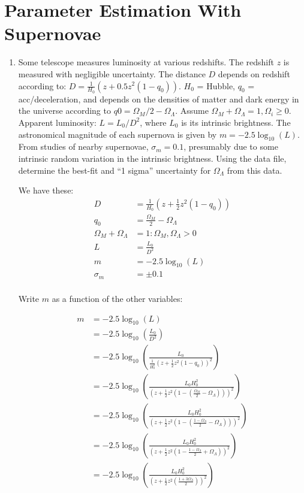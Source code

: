 \section{Parameter Estimation With Supernovae}

\begin{enumerate}[label=\textbf{\Alph*}.]
    \item Some telescope measures luminosity at various redshifts.
    The redshift $z$ is measured with negligible uncertainty.
    The distance $D$ depends on redshift according to: $D = \frac{1}{H_0}(z + 0.5z^2(1-q_0))$.
    $H_0$ = Hubble, $q_0$ = acc/deceleration, and depends on the densities of matter and dark energy in the universe according to $q0 = \Omega_M/2 - \Omega_\Lambda$.
    Assume $\Omega_M + \Omega_\Lambda = 1, \Omega_i \ge 0$.
    Apparent luminosity: $L=L_0/D^2$, where $L_0$ is its intrinsic brightness.
    The astronomical magnitude of each supernova is given by $m = -2.5\log_{10}(L)$.
    From studies of nearby supernovae, $\sigma_m = 0.1$, presumably due to some intrinsic random variation in the intrinsic brightness.
    Using the data file, determine the best-fit and ``1 sigma'' uncertainty for $\Omega_\Lambda$ from this data.

    We have these:
    \begin{align*}
        D &= \frac{1}{H_0} \left(z + \frac{1}{2}z^2 (1-q_0)\right)\\
        q_0 &= \frac{\Omega_M}{2} - \Omega_\Lambda\\
        \Omega_M + \Omega_\Lambda &= 1: \Omega_M, \Omega_\Lambda > 0\\
        L &= \frac{L_0}{D^2}\\
        m &= -2.5\log_{10}(L)\\
        \sigma_m &= \pm 0.1 \\
    \end{align*}

    Write $m$ as a function of the other variables:

    \begin{align*}
        m &= -2.5\log_{10}(L)\\
        &= -2.5\log_{10}\left(\frac{L_0}{D^2}\right)\\
        &= -2.5\log_{10}\left(\frac{L_0}{\frac{1}{H_0^2} \left(z + \frac{1}{2}z^2 (1-q_0)\right)^2}\right)\\
        &= -2.5\log_{10}\left(\frac{L_0H_0^2}{\left(z + \frac{1}{2}z^2 \left(1-\left(\frac{\Omega_M}{2} - \Omega_\Lambda\right)\right)\right)^2}\right)\\
        &= -2.5\log_{10}\left(\frac{L_0H_0^2}{\left(z + \frac{1}{2}z^2 \left(1-\left(\frac{1 - \Omega_\Lambda}{2} - \Omega_\Lambda\right)\right)\right)^2}\right)\\
        &= -2.5\log_{10}\left(\frac{L_0H_0^2}{\left(z + \frac{1}{2}z^2 \left(1-\frac{1 - \Omega_\Lambda}{2} + \Omega_\Lambda\right)\right)^2}\right)\\
        &= -2.5\log_{10}\left(\frac{L_0H_0^2}{\left(z + \frac{1}{2}z^2 \left(\frac{1 + 3\Omega_\Lambda}{2}\right)\right)^2}\right)\\
    \end{align*}


\end{enumerate}
